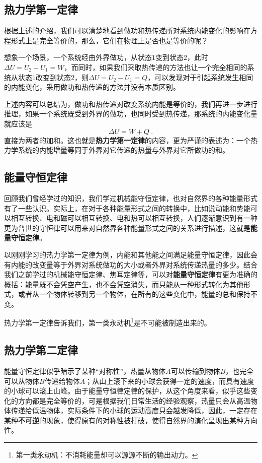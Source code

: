 \subsection{热力学第一定律}
根据上述的介绍，我们可以清楚地看到做功和热传递所对系统内能变化的影响在方程形式上是完全等价的，那么，它们在物理上是否也是等价的呢？

想象一个场景，一个系统经由外界做功，从状态$1$变到状态$2$，此时$\Delta U=U_2-U_1=W$，而同时，如果我们采取热传递的方法也让一个完全相同的系统从状态$1$改变到状态$2$，则$\Delta U=U_2-U_1=Q$，可以发现对于引起系统发生相同的内能变化，采用做功和热传递的方法并没有本质区别。

上述内容可以总结为，做功和热传递对改变系统内能是等价的，我们再进一步进行推理，如果一个系统既受到外界的做功，也同时受到热传递，那系统的内能变化量就应该是
$$\Delta U=W+Q~.$$
直接为两者的加和。这也就是\textbf{热力学第一定律}的内容，更为严谨的表述为：一个热力学系统的内能增量等同于外界对它传递的热量与外界对它所做功的和。

\subsection{能量守恒定律}
回顾我们曾经学过的知识，我们学过机械能守恒定律，也对自然界的各种能量形式有了一些认识。实际上，在对于各种能量形式之间的转换中，比如说动能和势能可以相互转换、电和磁可以相互转换、电和热可以相互转换，人们逐渐意识到有一种更为普世的守恒律可以用来对自然界各种能量形式之间的关系进行描述，这就是\textbf{能量守恒定律}。

以刚刚学习的热力学第一定律为例，内能和其他能之间满足能量守恒定律，因此会有内能的改变量等于外界对系统做功的大小或者外界对系统传递热量的多少。结合我们之前学过的机械能守恒定律、焦耳定律等，可以对\textbf{能量守恒定律}有更为准确的概括：能量既不会凭空产生，也不会凭空消失，而只能从一种形式转化为其他形式，或者从一个物体转移到另一个物体，在所有的这些变化中，能量的总和保持不变。

热力学第一定律告诉我们，第一类永动机\footnote{第一类永动机：不消耗能量却可以源源不断的输出动力。}是不可能被制造出来的。

\subsection{热力学第二定律}
能量守恒定律似乎暗示了某种“对称性”，热量从物体$A$可以传输到物体$B$，也完全可以从物体$B$传递给物体$A$；从山上滚下来的小球会获得一定的速度，而具有速度的小球可以滚上山峰。由于能量守恒律定律的保护，从这个角度来看，似乎这些变化的方向都是完全等价的，可是根据我们日常生活的经验观察，热量只会从高温物体传递给低温物体，实际条件下的小球的运动高度只会越发降低，因此，一定存在某种\textbf{不可逆}的现象，使得原有的对称性被打破，使得自然界的演化呈现出某种方向性。


